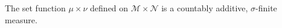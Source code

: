 The set function $\mu \times \nu$ defined on $\mathcal{M} \times \mathcal{N}$ is a countably additive, $\sigma$-finite measure.
